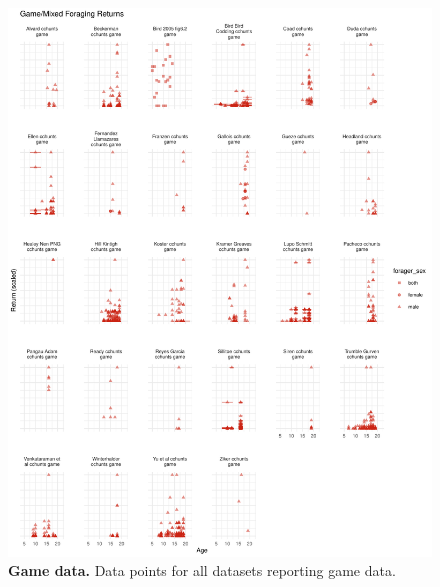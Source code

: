 \begin{figure}[h]
\centering
\includegraphics[width=12cm] {text/images/Figure_S10.pdf}
\renewcommand{\thefigure}{S\arabic{figure}}
\caption{\textbf{Game data.} Data points for all datasets reporting game data.}
\label{fig:game}
\end{figure}

